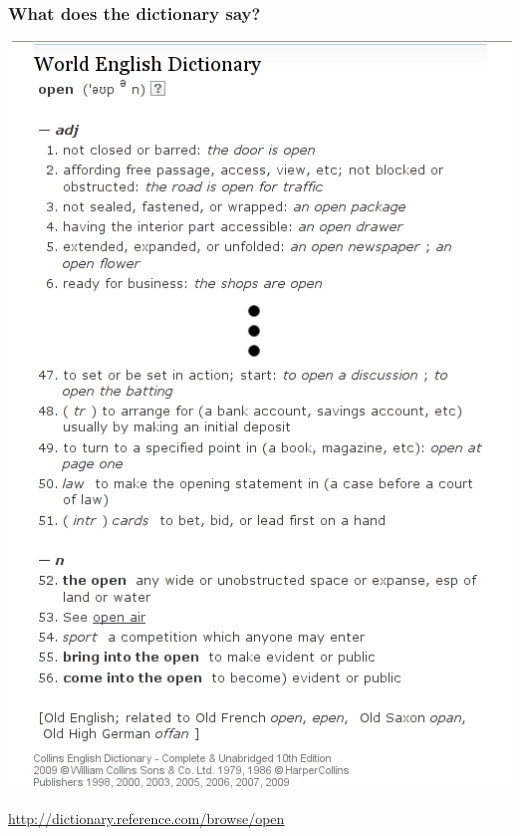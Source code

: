 \documentclass{beamer}
\begin{document}
\begin{frame}
  \frametitle{What does the dictionary say?}
  \begin{center}\includegraphics[height=0.8\textheight]{../img/dictionary2}

    \href{http://dictionary.reference.com/browse/open}{http://dictionary.reference.com/browse/open}
  \end{center}
\end{frame}
\end{document}
